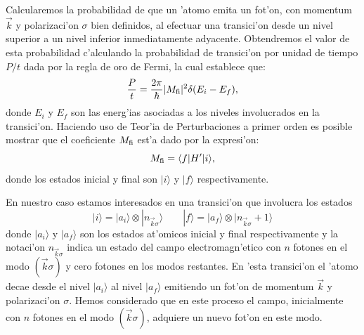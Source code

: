 Calcularemos la probabilidad de que un 'atomo emita un fot'on, con momentum
$\vec{k}$ y polarizaci'on $\sigma$ bien definidos, al efectuar una transici'on
desde un nivel superior a un nivel inferior inmediatamente adyacente.
Obtendremos el valor de esta probabilidad c'alculando la probabilidad de
transici'on por unidad de tiempo $P/t$ dada por la regla de oro de Fermi, la
cual establece que:
\begin{equation}
\frac{P}{t}=\frac{2\pi}{\hbar}|M_{\rm fi}|^2\delta(E_i-E_f),
\end{equation}
donde $E_i$ y $E_f$ son las energ'ias asociadas a los niveles involucrados en la
transici'on. Haciendo uso de Teor'ia de Perturbaciones a primer orden es posible
mostrar que el coeficiente $M_{\rm fi}$ est'a dado por la expresi'on:
\begin{equation}
M_{\rm fi}=\langle f|H'|i\rangle ,
\end{equation}
donde los estados inicial y final son $|i\rangle $ y $|f\rangle $
respectivamente.

En nuestro caso estamos interesados en una transici'on que involucra los estados
\begin{equation}
|i\rangle =|a_i\rangle \otimes|n_{\vec{k}\sigma}\rangle 	
\qquad
|f\rangle =|a_f\rangle \otimes|n_{\vec{k}\sigma}+1\rangle 	
\end{equation}
donde $|a_i\rangle $ y $|a_f\rangle $ son los estados at'omicos inicial y final
respectivamente y la notaci'on $n_{\vec{k}\sigma}$ indica un estado del campo
electromagn'etico con $n$ fotones en el modo $(\vec{k}\sigma)$ y cero fotones
en
los modos restantes. En 'esta transici'on el 'atomo decae desde el nivel
$|a_i\rangle $ al nivel $|a_f\rangle $ emitiendo un fot'on de momentum $\vec{k}$
y
polarizaci'on $\sigma$. Hemos considerado que en este proceso el campo,
inicialmente con $n$ fotones en el modo $(\vec{k}\sigma)$, adquiere un nuevo
fot'on en este modo.  

